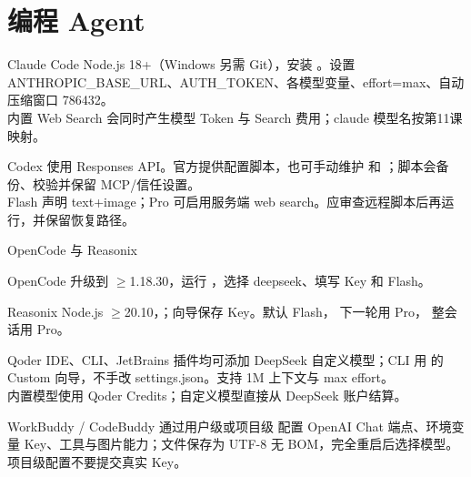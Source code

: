 \documentclass[aspectratio=169,UTF8]{ctexbeamer}
\begin{document}
\section{编程 Agent}
\begin{frame}{Claude Code}
Node.js 18+（Windows 另需 Git），安装 。设置 ANTHROPIC\_BASE\_URL、AUTH\_TOKEN、各模型变量、effort=max、自动压缩窗口 786432。\\[8pt]
内置 Web Search 会同时产生模型 Token 与 Search 费用；claude 模型名按第11课映射。
\end{frame}
\begin{frame}{Codex}
使用 Responses API。官方提供配置脚本，也可手动维护  和 ；脚本会备份、校验并保留 MCP/信任设置。\\[8pt]
Flash 声明 text+image；Pro 可启用服务端 web search。应审查远程脚本后再运行，并保留恢复路径。
\end{frame}
\begin{frame}{OpenCode 与 Reasonix}
\begin{block}{OpenCode}
升级到 $\ge$1.18.30，运行 ，选择 deepseek、填写 Key 和 Flash。
\end{block}
\begin{block}{Reasonix}
Node.js $\ge$20.10，；向导保存 Key。默认 Flash， 下一轮用 Pro， 整会话用 Pro。
\end{block}
\end{frame}
\begin{frame}{Qoder}
IDE、CLI、JetBrains 插件均可添加 DeepSeek 自定义模型；CLI 用  的 Custom 向导，不手改 settings.json。支持 1M 上下文与 max effort。\\[8pt]
内置模型使用 Qoder Credits；自定义模型直接从 DeepSeek 账户结算。
\end{frame}
\begin{frame}{WorkBuddy / CodeBuddy}
通过用户级或项目级  配置 OpenAI Chat 端点、环境变量 Key、工具与图片能力；文件保存为 UTF-8 无 BOM，完全重启后选择模型。\\[8pt]
项目级配置不要提交真实 Key。
\end{frame}
\end{document}
